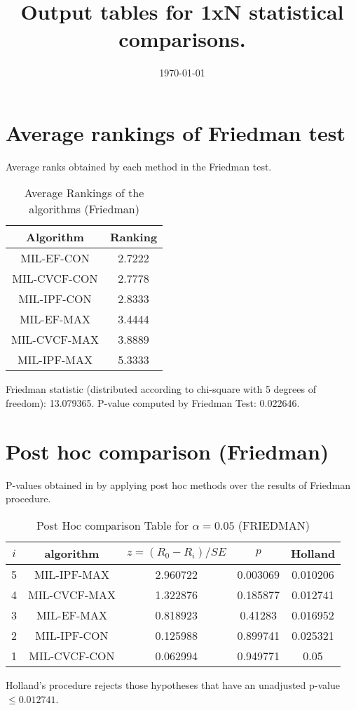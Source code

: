 \documentclass[a4paper,10pt]{article}
\title{Output tables for 1xN statistical comparisons.}
\author{}
\date{\today}
\begin{document}
\begin{landscape}
\pagestyle{empty}
\maketitle
\thispagestyle{empty}

\section{Average rankings of Friedman test}


Average ranks obtained by each method in the Friedman test.

\begin{table}[!htp]
\centering
\begin{tabular}{|c|c|}\hline
Algorithm&Ranking\\\hline
MIL-EF-CON&2.7222\\MIL-CVCF-CON&2.7778\\MIL-IPF-CON&2.8333\\MIL-EF-MAX&3.4444\\MIL-CVCF-MAX&3.8889\\MIL-IPF-MAX&5.3333\\\hline\end{tabular}
\caption{Average Rankings of the algorithms (Friedman)}
\end{table}

Friedman statistic (distributed according to chi-square with 5 degrees of freedom): 13.079365. \newline P-value computed by Friedman Test: 0.022646.\newline


\newpage

\section{Post hoc comparison (Friedman)}


P-values obtained in by applying post hoc methods over the results of Friedman procedure.

\begin{table}[!htp]
\centering\footnotesize
\begin{tabular}{ccccc}
$i$&algorithm&$z=(R_0 - R_i)/SE$&$p$&Holland\\
\hline5&MIL-IPF-MAX&2.960722&0.003069&0.010206\\4&MIL-CVCF-MAX&1.322876&0.185877&0.012741\\3&MIL-EF-MAX&0.818923&0.41283&0.016952\\2&MIL-IPF-CON&0.125988&0.899741&0.025321\\1&MIL-CVCF-CON&0.062994&0.949771&0.05\\\hline
\end{tabular}
\caption{Post Hoc comparison Table for $\alpha=0.05$ (FRIEDMAN)}
\end{table}Holland's procedure rejects those hypotheses that have an unadjusted p-value $\le0.012741$.



\end{landscape}
\end{document}

